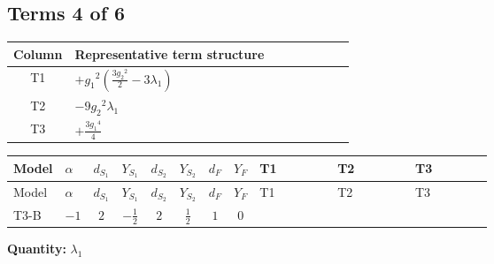 \documentclass[8pt]{article}
\begin{document}
\begin{landscape}
\subsection*{Terms 4 of 6}
\begin{center}
\begin{tabular}{@{}c >{\raggedright\arraybackslash}p{0.82\linewidth}@{}}
\toprule
Column & Representative term structure \\
\midrule
T1 & \(\displaystyle +{g_1}^2 \left(\frac{3 {g_2}^2}{2}-3 {\lambda_1}\right)\) \\
\midrule
T2 & \(\displaystyle -9 {g_2}^2 {\lambda_1}\) \\
\midrule
T3 & \(\displaystyle +\frac{3 {g_1}^4}{4}\) \\
\midrule
\bottomrule
\end{tabular}
\end{center}
\smallskip
\tiny
\begin{longtable}{@{}llcccccc >{\raggedright\arraybackslash}p{0.21\linewidth} >{\raggedright\arraybackslash}p{0.21\linewidth} >{\raggedright\arraybackslash}p{0.21\linewidth}@{}}
\toprule
Model & $\alpha$ & $d_{S_1}$ & $Y_{S_1}$ & $d_{S_2}$ & $Y_{S_2}$ & $d_F$ & $Y_F$ & T1 & T2 & T3 \\
\midrule
\endfirsthead
\toprule
Model & $\alpha$ & $d_{S_1}$ & $Y_{S_1}$ & $d_{S_2}$ & $Y_{S_2}$ & $d_F$ & $Y_F$ & T1 & T2 & T3 \\
\midrule
\endhead
T3-B & $-1$ & $2$ & $-\frac{1}{2}$ & $2$ & $\frac{1}{2}$ & $1$ & $0$ & \scriptsize\adjustbox{max width=\linewidth}{$\begin{gathered} +{g_1}^2 \left(\frac{3 {g_2}^2}{2}-3 {\lambda_1}\right)\end{gathered}$} & \scriptsize\adjustbox{max width=\linewidth}{$\begin{gathered} -9 {g_2}^2 {\lambda_1}\end{gathered}$} & \scriptsize\adjustbox{max width=\linewidth}{$\begin{gathered} +\frac{3 {g_1}^4}{4}\end{gathered}$} \\
\midrule
\bottomrule
\end{longtable}
\clearpage
\noindent\textbf{Quantity: }$\lambda_1$\par\smallskip

\end{landscape}
\end{document}
